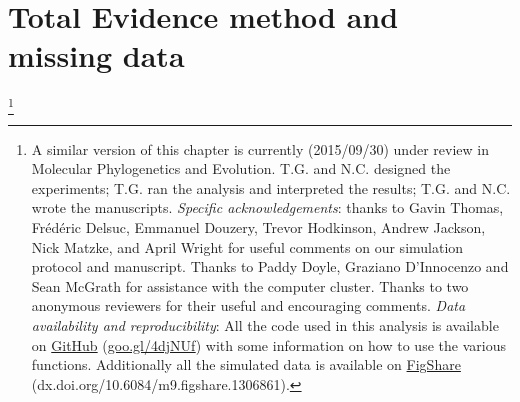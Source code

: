

%
%

\chapter[Total Evidence method and missing data]{Total Evidence method and missing data}
\label{chap:TEM_paper}

\bigskip
\medskip
\begin{center}

\footnote{A similar version of this chapter is currently (2015/09/30) under review in Molecular Phylogenetics and Evolution. T.G. and N.C. designed the experiments; T.G. ran the analysis and interpreted the results; T.G. and N.C. wrote the manuscripts. \textit{Specific acknowledgements}: thanks to Gavin Thomas, Fr\'{e}d\'{e}ric Delsuc, Emmanuel Douzery, Trevor Hodkinson, Andrew Jackson, Nick Matzke, and April Wright for useful comments on our simulation protocol and manuscript. Thanks to Paddy Doyle, Graziano D'Innocenzo and Sean McGrath for assistance with the computer cluster. Thanks to two anonymous reviewers for their useful and encouraging comments. \textit{Data availability and reproducibility}: All the code used in this analysis is available on \href{https://github.com/TGuillerme/Total_Evidence_Method-Missing_data}{GitHub} (\href{https://github.com/TGuillerme/Total_Evidence_Method-Missing_data}{goo.gl/4djNUf}) with some information on how to use the various functions. Additionally all the simulated data is available on \href{http://figshare.com/articles/Effect_of_missing_data_on_topological_inference_using_a_total_evidence_approach/1306861}{FigShare} (dx.doi.org/10.6084/m9.figshare.1306861).} \\

\end{center}
%
%
